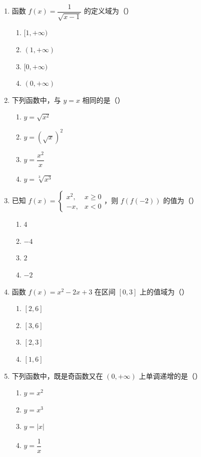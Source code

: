 \documentclass[12pt, a4paper]{ctexart}
\begin{document}
\begin{enumerate}
\item 函数 $f(x)=\dfrac{1}{\sqrt{x-1}}$ 的定义域为（\quad）
  \begin{enumerate}[label=\Alph*., itemsep=0pt]
    \item $[1,+\infty)$ \quad \item $(1,+\infty)$ \quad \item $[0,+\infty)$ \quad \item $(0,+\infty)$
  \end{enumerate}

\item 下列函数中，与 $y=x$ 相同的是（\quad）
  \begin{enumerate}[label=\Alph*., itemsep=0pt]
    \item $y=\sqrt{x^2}$ \quad \item $y=(\sqrt{x})^2$ \quad \item $y=\dfrac{x^2}{x}$ \quad \item $y=\sqrt[3]{x^3}$
  \end{enumerate}

\item 已知 $f(x)=\begin{cases} x^2, & x\geq 0 \\ -x, & x<0 \end{cases}$，则 $f(f(-2))$ 的值为（\quad）
  \begin{enumerate}[label=\Alph*., itemsep=0pt]
    \item $4$ \quad \item $-4$ \quad \item $2$ \quad \item $-2$
  \end{enumerate}

\item 函数 $f(x)=x^2-2x+3$ 在区间 $[0,3]$ 上的值域为（\quad）
  \begin{enumerate}[label=\Alph*., itemsep=0pt]
    \item $[2,6]$ \quad \item $[3,6]$ \quad \item $[2,3]$ \quad \item $[1,6]$
  \end{enumerate}

\item 下列函数中，既是奇函数又在 $(0,+\infty)$ 上单调递增的是（\quad）
  \begin{enumerate}[label=\Alph*., itemsep=0pt]
    \item $y=x^2$ \quad \item $y=x^3$ \quad \item $y=|x|$ \quad \item $y=\dfrac{1}{x}$
  \end{enumerate}


\end{enumerate}
\end{document}
